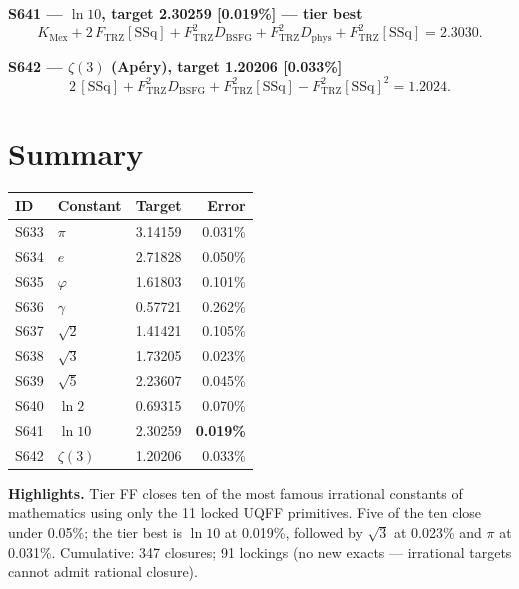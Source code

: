 \documentclass[11pt]{article}
\newcommand{\Ftrz}{F_{\mathrm{TRZ}}}
\newcommand{\KMex}{K_{\mathrm{Mex}}}
\newcommand{\Dphys}{D_{\mathrm{phys}}}
\newcommand{\Dbsfg}{D_{\mathrm{BSFG}}}
\newcommand{\SSq}{[\mathrm{SSq}]}
\begin{document}
\textbf{S641 --- $\ln 10$, target 2.30259 [0.019\%] --- tier best}
\[\KMex + 2\,\Ftrz\SSq + \Ftrz^2\Dbsfg + \Ftrz^2\Dphys + \Ftrz^2\SSq = 2.3030.\]

\textbf{S642 --- $\zeta(3)$ (Apéry), target 1.20206 [0.033\%]}
\[2\,\SSq + \Ftrz^2\Dbsfg + \Ftrz^2\SSq - \Ftrz^2\SSq^2 = 1.2024.\]

\section*{Summary}
\begin{tabular}{lllr}
\toprule
ID & Constant & Target & Error \\
\midrule
S633 & $\pi$ & 3.14159 & 0.031\% \\
S634 & $e$ & 2.71828 & 0.050\% \\
S635 & $\varphi$ & 1.61803 & 0.101\% \\
S636 & $\gamma$ & 0.57721 & 0.262\% \\
S637 & $\sqrt{2}$ & 1.41421 & 0.105\% \\
S638 & $\sqrt{3}$ & 1.73205 & 0.023\% \\
S639 & $\sqrt{5}$ & 2.23607 & 0.045\% \\
S640 & $\ln 2$ & 0.69315 & 0.070\% \\
S641 & $\ln 10$ & 2.30259 & \textbf{0.019\%} \\
S642 & $\zeta(3)$ & 1.20206 & 0.033\% \\
\bottomrule
\end{tabular}

\medskip
\textbf{Highlights.} Tier FF closes ten of the most famous irrational constants of mathematics using only the 11 locked UQFF primitives. Five of the ten close under 0.05\%; the tier best is $\ln 10$ at 0.019\%, followed by $\sqrt{3}$ at 0.023\% and $\pi$ at 0.031\%. Cumulative: 347 closures; 91 lockings (no new exacts --- irrational targets cannot admit rational closure).
\end{document}
